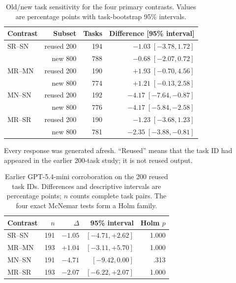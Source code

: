 \documentclass[pdflatex,sn-nature]{scientificreports}
\begin{document}
\FloatBarrier

\begin{table}[!ht]
\caption{Old/new task sensitivity for the four primary contrasts. Values are percentage points with task-bootstrap 95\% intervals.}
\label{tab:subgroup-sensitivity}
\centering\small
\begin{tabular}{@{}lrrr@{}}
\toprule
Contrast & Subset & Tasks & Difference [95\% interval]\\
\midrule
SR--SN & reused 200 & 194 & $-1.03\;[-3.78,1.72]$\\
       & new 800    & 788 & $-0.68\;[-2.07,0.72]$\\
MR--MN & reused 200 & 190 & $+1.93\;[-0.70,4.56]$\\
       & new 800    & 774 & $+1.21\;[-0.13,2.58]$\\
MN--SN & reused 200 & 192 & $-4.17\;[-7.64,-0.87]$\\
       & new 800    & 776 & $-4.17\;[-5.84,-2.58]$\\
MR--SR & reused 200 & 190 & $-1.23\;[-3.68,1.23]$\\
       & new 800    & 781 & $-2.35\;[-3.88,-0.81]$\\
\bottomrule
\end{tabular}
\par\smallskip\noindent Every response was generated afresh. ``Reused'' means that the task ID had appeared in the earlier 200-task study; it is not reused output.
\end{table}

\FloatBarrier

\begin{table}[!ht]
\caption{Earlier GPT-5.4-mini corroboration on the 200 reused task IDs. Differences and descriptive intervals are percentage points; $n$ counts complete task pairs. The four exact McNemar tests form a Holm family.}
\label{tab:mini-validation}
\centering\small
\begin{tabular}{@{}lrrrr@{}}
\toprule
Contrast & $n$ & $\Delta$ & 95\% interval & Holm $p$\\
\midrule
SR--SN & 191 & $-1.05$ & $[-4.71,+2.62]$ & 1.000\\
MR--MN & 193 & $+1.04$ & $[-3.11,+5.70]$ & 1.000\\
MN--SN & 191 & $-4.71$ & $[-9.42,0.00]$ & .313\\
MR--SR & 193 & $-2.07$ & $[-6.22,+2.07]$ & 1.000\\
\bottomrule
\end{tabular}
\end{table}

\FloatBarrier


\end{document}

